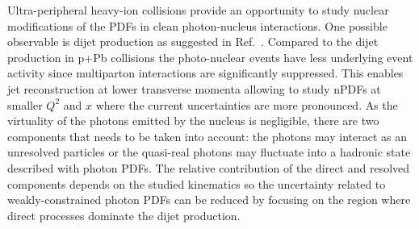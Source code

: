 \documentclass[../report.tex]{subfiles}
\begin{document}
Ultra-peripheral heavy-ion collisions provide an opportunity to study nuclear modifications of the PDFs in clean photon-nucleus interactions. One possible observable is dijet production as suggested in Ref.~\cite{Strikman:2005yv}. Compared to the dijet production in p+Pb collisions the photo-nuclear events have less underlying event activity since multiparton interactions are significantly suppressed. This enables jet reconstruction at lower transverse momenta allowing to study nPDFs at smaller $Q^2$ and $x$ where the current uncertainties are more pronounced. As the virtuality of the photons emitted by the nucleus is negligible, there are two components that needs to be taken into account: the photons may interact as an unresolved particles or the quasi-real photons may fluctuate into a hadronic state described with photon PDFs. The relative contribution of the direct and resolved components depends on the studied kinematics so the uncertainty related to weakly-constrained photon PDFs can be reduced by focusing on the region where direct processes dominate the dijet production.
\end{document}

